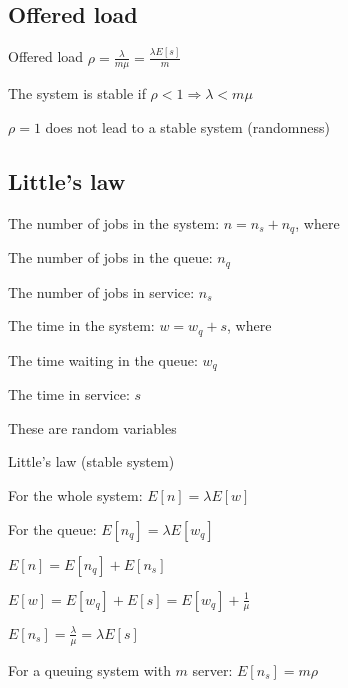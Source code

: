 \subsection{Offered load}
\enumstart
	\item Offered load $\rho = \frac{\lambda}{m\mu} = \frac{\lambda E[s]}{m}$
	\item The system is stable if $\rho < 1 \Rightarrow \lambda < m\mu$
	\item $\rho = 1$ does not lead to a stable system (randomness)
\enumend

\subsection{Little's law}
\enumstart
	\item The number of jobs in the system: $n = n_s + n_q$, where
	\enumstart
		\item The number of jobs in the queue: $n_q$
		\item The number of jobs in service: $n_s$
	\enumend
	\item The time in the system: $w = w_q + s$, where
	\enumstart
		\item The time waiting in the queue: $w_q$
		\item The time in service: $s$
	\enumend
	\item These are random variables
	\item Little's law (stable system)
	\enumstart
		\item For the whole system: $E[n] = \lambda E[w]$
		\item For the queue: $E[n_q] = \lambda E[w_q]$
		\item $E[n] = E[n_q] + E[n_s]$
		\item $E[w] = E[w_q] + E[s] = E[w_q] + \frac{1}{\mu}$
	\enumend
	\item $E[n_s] = \frac{\lambda}{\mu} = \lambda E[s]$
	\item For a queuing system with $m$ server: $E[n_s] = m \rho$
\enumend

